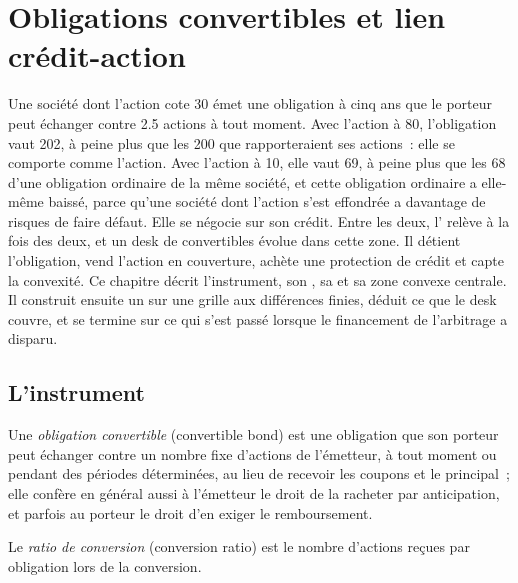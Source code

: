\chapter{Obligations convertibles et lien crédit-action}\label{ch:dv:convertibles-and-the-credit-equity-link}

Une société dont l'action cote 30 émet une obligation à cinq ans que le porteur peut échanger contre 2.5 actions à tout moment. Avec l'action
à 80, l'obligation vaut 202, à peine plus que les 200 que rapporteraient ses actions~: elle se comporte comme l'action. Avec l'action à
10, elle vaut 69, à peine plus que les 68 d'une obligation ordinaire de la même société, et cette obligation ordinaire a elle-même baissé, parce qu'une
société dont l'action s'est effondrée a davantage de risques de faire défaut. Elle se négocie sur son crédit. Entre les deux, l' relève à la fois des deux,
et un desk de convertibles évolue dans cette zone. Il détient l'obligation, vend l'action en couverture, achète une protection de crédit et capte la
convexité. Ce chapitre décrit l'instrument, son , sa  et sa zone convexe centrale. Il construit ensuite un
 sur une grille aux différences finies, déduit ce que le desk couvre, et se termine sur ce qui s'est passé lorsque le financement de l'arbitrage
a disparu.

\section{L'instrument}

\begin{definition}\label{def:dv:convertibles-and-the-credit-equity-link:cb}
Une \emph{obligation convertible} (convertible bond) est une obligation que son porteur peut échanger contre un nombre fixe d'actions de l'émetteur,
à tout moment ou pendant des périodes déterminées, au lieu de recevoir les coupons et le principal~; elle confère en général aussi à l'émetteur le droit de la
racheter par anticipation, et parfois au porteur le droit d'en exiger le remboursement.
\end{definition}

\begin{definition}\label{def:dv:convertibles-and-the-credit-equity-link:ratio}
Le \emph{ratio de conversion} (conversion ratio) est le nombre d'actions reçues par obligation lors de la conversion.
\end{definition}

